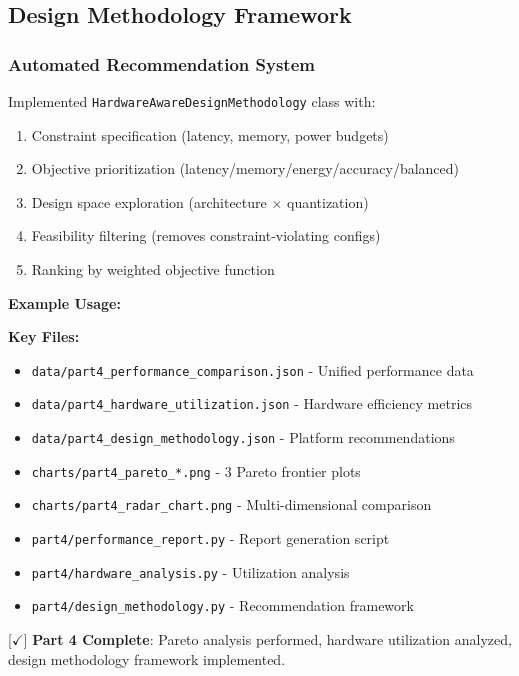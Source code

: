 \documentclass[10pt, a4paper]{article}
\begin{document}
\subsection{Design Methodology Framework}

\subsubsection{Automated Recommendation System}

Implemented \texttt{HardwareAwareDesignMethodology} class with:
\begin{enumerate}
    \item Constraint specification (latency, memory, power budgets)
    \item Objective prioritization (latency/memory/energy/accuracy/balanced)
    \item Design space exploration (architecture $\times$ quantization)
    \item Feasibility filtering (removes constraint-violating configs)
    \item Ranking by weighted objective function
\end{enumerate}

\textbf{Example Usage:}


\textbf{Key Files:}
\begin{itemize}
    \item \texttt{data/part4\_performance\_comparison.json} - Unified performance data
    \item \texttt{data/part4\_hardware\_utilization.json} - Hardware efficiency metrics
    \item \texttt{data/part4\_design\_methodology.json} - Platform recommendations
    \item \texttt{charts/part4\_pareto\_*.png} - 3 Pareto frontier plots
    \item \texttt{charts/part4\_radar\_chart.png} - Multi-dimensional comparison
    \item \texttt{part4/performance\_report.py} - Report generation script
    \item \texttt{part4/hardware\_analysis.py} - Utilization analysis
    \item \texttt{part4/design\_methodology.py} - Recommendation framework
\end{itemize}

[$\checkmark$] \textbf{Part 4 Complete}: Pareto analysis performed, hardware utilization analyzed, design methodology framework implemented.
\end{document}
